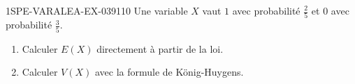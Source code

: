 \begin{exercice}{1SPE-VARALEA-EX-039}{1}{10}
Une variable $X$ vaut $1$ avec probabilité $\frac25$ et $0$ avec probabilité $\frac35$.

\begin{enumerate}
  \item Calculer $E(X)$ directement à partir de la loi.
  \item Calculer $V(X)$ avec la formule de König-Huygens.
\end{enumerate}
\end{exercice}
